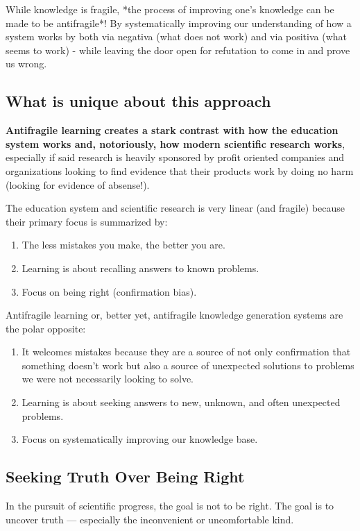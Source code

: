 \documentclass{article}
\begin{document}
While knowledge is fragile, *the process of improving one's knowledge can be made to be antifragile*! By systematically improving our understanding of how a system works by both via negativa (what does not work) and via positiva (what seems to work) - while leaving the door open for refutation to come in and prove us wrong.

\subsection{What is unique about this approach}

\textbf{Antifragile learning creates a stark contrast with how the education system works and, notoriously, how modern scientific research works}, especially if said research is heavily sponsored by profit oriented companies and organizations looking to find evidence that their products work by doing no harm (looking for evidence of absense!).

The education system and scientific research is very linear (and fragile) because their primary focus is summarized by:
\begin{enumerate}
	\item The less mistakes you make, the better you are.
	\item Learning is about recalling answers to known problems.
	\item Focus on being right (confirmation bias).
\end{enumerate}


Antifragile learning or, better yet, antifragile knowledge generation systems are the polar opposite:
\begin{enumerate}
	\item It welcomes mistakes because they are a source of not only confirmation that something doesn't work but also a source of unexpected solutions to problems we were not necessarily looking to solve.
	\item Learning is about seeking answers to new, unknown, and often unexpected problems.
	\item Focus on systematically improving our knowledge base.
\end{enumerate}


\subsection{Seeking Truth Over Being Right}

In the pursuit of scientific progress, the goal is not to be right. The goal is to uncover truth — especially the inconvenient or uncomfortable kind.
\end{document}
